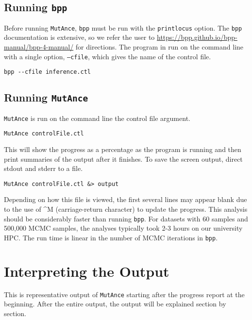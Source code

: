 \documentclass[11pt]{article}
\begin{document}
\subsection{Running \texttt{bpp}}
Before running \texttt{MutAnce}, \texttt{bpp} must be run with the \texttt{printlocus} option. 
The \texttt{bpp} documentation is extensive, so we refer the user to \href{https://bpp.github.io/bpp-manual/bpp-4-manual/}{https://bpp.github.io/bpp-manual/bpp-4-manual/} for directions. 
The program in run on the command line with a single option, \texttt{--cfile}, which gives the name of the control file.
\begin{Verbatim}[frame=single, fontsize=\small]
bpp --cfile inference.ctl
\end{Verbatim}

\subsection{Running \texttt{MutAnce}}
\texttt{MutAnce} is run on the command line the control file argument. 
\begin{Verbatim}[frame=single, fontsize=\small]
MutAnce controlFile.ctl
\end{Verbatim}
This will show the progress as a percentage as the program is running and then print summaries of the output after it finishes. 
To save the screen output, direct stdout and stderr to a file. 
\begin{Verbatim}[frame=single, fontsize=\small]
MutAnce controlFile.ctl &> output
\end{Verbatim}
Depending on how this file is viewed, the first several lines may appear blank due to the use of \^{}M  (carriage-return character) to update the progress.
This analysis should be considerably faster than running \texttt{bpp}.
For datasets with 60 samples and 500,000 MCMC samples, the analyses typically took 2-3 hours on our university HPC.
The run time is linear in the number of MCMC iterations in \texttt{bpp}.

\section{Interpreting the Output}
This is representative output of \texttt{MutAnce} starting after the progress report at the beginning. 
After the entire output, the output will be explained section by section.
\end{document}
